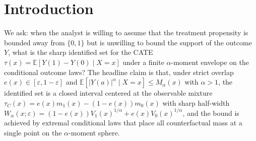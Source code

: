 \documentclass[11pt]{article}
\newcommand{\E}{\mathbb{E}}
\theoremstyle{definition}
\theoremstyle{plain}
\theoremstyle{remark}
\begin{document}
\begin{abstract}
We study sharp partial identification of the conditional average treatment effect
$\tau(x) = \E[Y(1)-Y(0)\mid X=x]$ when (i)~the propensity score satisfies strict
overlap $e(x) \in [\varepsilon, 1-\varepsilon]$ and (ii)~the conditional outcome
laws satisfy only a finite $\alpha$-moment envelope $\E[|Y(a)|^\alpha\mid X=x] \le M_\alpha(x)$
for some $\alpha > 1$, with no sub-Gaussian or sub-exponential bound and no
restriction on the support of $Y$. The kernel claim is a closed-form sharp
identified interval $[\tau_L(x),\tau_U(x)]$ whose half-width factorises as
$W_\alpha(x;\varepsilon) = (1-e(x))V_1(x)^{1/\alpha} + e(x)V_0(x)^{1/\alpha}$
with $V_a$ a computable affine functional of $(M_\alpha, e, \nu_a^\alpha)$. The
formula recovers \citet{AronowLee2013} as $\alpha\to\infty$, recovers worst-case
\citet{Manski1990} support bounds when $M_\alpha$ is replaced by $\|Y\|_\infty^\alpha$,
and is strictly tighter than both whenever $M_\alpha(x)^{1/\alpha} < \mathrm{ess\,sup}\,|Y(a)|$.
We conjecture a critical-$\alpha$ phase transition at $\alpha=1$: vacuous (infinite
width) below, finite for all $\alpha>1$. The result closes a gap left open in
\citet{LordanSalehzadehNobari2026TailUncertainty} and \citet{JungKang2026ITBounds}.
\end{abstract}

\section{Introduction}

We ask: when the analyst is willing to assume that the treatment propensity is
bounded away from $\{0,1\}$ but is unwilling to bound the support of the outcome
$Y$, what is the sharp identified set for the CATE $\tau(x) = \E[Y(1) - Y(0) \mid X=x]$
under a finite $\alpha$-moment envelope on the conditional outcome laws?
The headline claim is that, under strict overlap $e(x) \in [\varepsilon, 1-\varepsilon]$
and $\E[|Y(a)|^\alpha\mid X=x] \le M_\alpha(x)$ with $\alpha>1$, the identified set
is a closed interval centered at the observable mixture $\tau_C(x) = e(x)m_1(x) - (1-e(x))m_0(x)$
with sharp half-width $W_\alpha(x;\varepsilon) = (1-e(x))V_1(x)^{1/\alpha} + e(x)V_0(x)^{1/\alpha}$,
and the bound is achieved by extremal conditional laws that place all counterfactual mass at a
single point on the $\alpha$-moment sphere.
\end{document}
